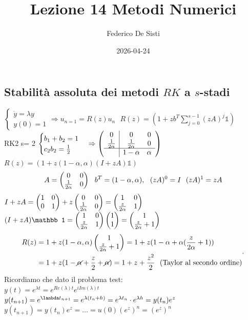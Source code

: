 \documentclass[12px]{article}
\title{Lezione 14 Metodi Numerici}
\date{2026-04-24}
\author{Federico De Sisti}
\begin{document}
	\maketitle
	\newpage
	\subsection{Stabilità assoluta dei metodi $RK$ a $s$-stadi }
	$ \begin{cases}
		\dot y = \lambda y\\
		y(0) = 1
	\end{cases} \Rightarrow  u_{n=1} = R(z)u_n\ \ \ R(z) = (1 + zb^T \sum^{s-1}_{j=0}(zA)^j\mathbb 1)$\\
	RK2 s= 2
	$ \begin{cases}
		b_1 + b_2 =1\\
		c_2b_2 = \frac 12
		\end{cases} \Rightarrow \left( \begin{array}{c|c c}
			0 & 0 & 0 \\
			\frac 1{2 \alpha} & \frac 1 {2\alpha} & 0\\
			\hline
					  & 1 - \alpha & \alpha
	\end{array} \right)$ \\
	$R(z) = (1 + z(1-\alpha,\alpha)(I+zA)\mathbb 1)$\\
\[A = \begin{pmatrix}0 & 0\\ \frac 1 {2\alpha}& 0\end{pmatrix}\ \ b^T = (1-\alpha,\alpha), \ \ (zA)^0 = I \ \ (zA)^1 = zA\]
$I + zA = \begin{pmatrix}1 & 0\\ 0 & 1\end{pmatrix} + z\begin{pmatrix} 0 & 0\\\frac 1 {2\alpha} &0\end{pmatrix} = \begin{pmatrix}1 & 0 \\ \frac z{2\alpha} & 1\end{pmatrix}$\\
$(I + zA)\mathbb 1 = \matrice{1 & 0 \\ \frac z{2\alpha} & 1}\matrice {1\\1} = \matrice {1\\ \frac z {2\alpha} + 1}$
 \[
\begin{split}
R(z) &= 1 + z(1-\alpha,\alpha) \begin{pmatrix}1\\\frac z {2\alpha} + 1\end{pmatrix} =1 + z (1-\alpha + \alpha(\frac z {2\alpha} + 1))\\
     &= 1 + z( 1 - \cancel {\alpha} + \frac z 2 + \cancel{\alpha} ) = 1 + z + \frac {z^2} 2 \ \ \text{(Taylor al secondo ordine)}
\end{split}
.\] 
Ricordiamo che dato il problema test:\\
$y(t) = e^{\lambda t} = e^{Re(\lambda)t}e^{iIm(\lambda)t}$\\
$y(t_{n+1}) = e^{\lanbda t_{n+1}} = e^{\lambda(t_n+h)} = e^{\lambda t_n}\cdot e^{\lambda h} = y(t_n)e^z$\\
$y(t_{n+1}) = y(t_n)e^z = \ldots = u(0)(e^z)^n = (e^z)^n$ 
\end{document}
